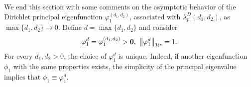 \documentclass[a4paper,11pt]{amsart}
\theoremstyle{definition}
\def\O{\Omega}
\numberwithin{equation}{section}
\theoremstyle{definition}
\def\O{\Omega}
\begin{document}
%
%
%








We end this section with some comments on  the asymptotic behavior of the Dirichlet principal eigenfunction $\varphi_1^{(d_1,d_2)}$,   associated with $\lambda_p^D(d_1,d_2)$, as $\max\{d_1,d_2\}\rightarrow 0$. Define $d=\max\{d_1,d_2\}$ and consider 
\begin{align*}
\varphi_1^{d}=\varphi_1^{(d_1,d_2)}>{\bf 0},~\left\|\varphi_1^{d}\right\|_{\mathcal{H}^{\bf s}}=1.
\end{align*}
For every $d_1,d_2>0$, the choice of $\varphi_1^{d}$ is unique. Indeed, if another eigenfunction $\phi_1$ with the same properties exists, the simplicity of the principal eigenvalue implies that $\phi_1 \equiv \varphi_1^{d}$.
\end{document}
